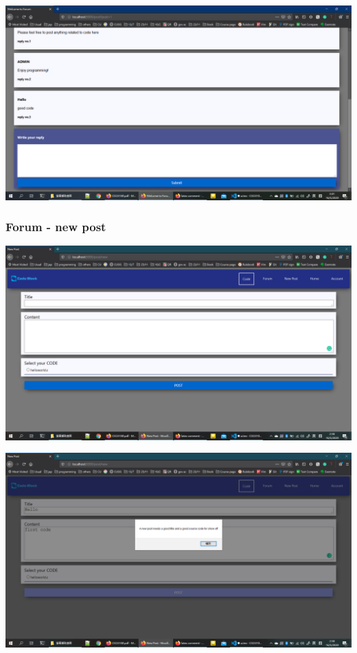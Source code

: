 \includegraphics[scale=0.4]{Doc/Pics/post_comment.png}

\subsubsection{Forum - new post}
\includegraphics[scale=0.4]{Doc/Pics/new_post.png}

\includegraphics[scale=0.4]{Doc/Pics/new_post_warn.png}

